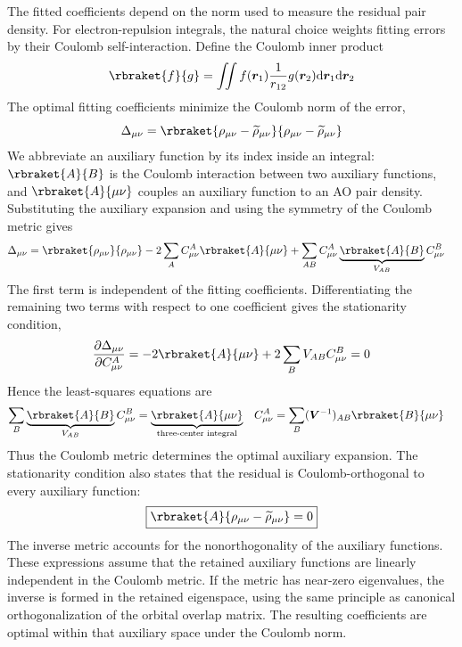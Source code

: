The fitted coefficients depend on the norm used to measure the residual pair
density. For electron-repulsion integrals, the natural choice weights fitting
errors by their Coulomb self-interaction. Define the Coulomb inner product
\begin{equation}
 \rbraket{f}{g}=\iint f(\br_1)\frac{1}{r_{12}}g(\br_2)
 \dd\br_1\dd\br_2
\end{equation}
The optimal fitting coefficients minimize the Coulomb norm of the error,
\begin{equation}
 \Delta_{\mu\nu}=\rbraket{\rho_{\mu\nu}-\widetilde\rho_{\mu\nu}}
 {\rho_{\mu\nu}-\widetilde\rho_{\mu\nu}}
\end{equation}
We abbreviate an auxiliary function by its index inside an integral:
$\rbraket{A}{B}$ is the Coulomb interaction between two auxiliary functions,
and $\rbraket{A}{\mu\nu}$ couples an auxiliary function to an AO pair density.
Substituting the auxiliary expansion and using the symmetry of the Coulomb
metric gives
\begin{equation}
\begin{split}
 \Delta_{\mu\nu}
 ={}&\rbraket{\rho_{\mu\nu}}{\rho_{\mu\nu}}
 -2\sum_A C_{\mu\nu}^A\rbraket{A}{\mu\nu}
 +\sum_{AB}C_{\mu\nu}^A
 \underbrace{\rbraket{A}{B}}_{V_{AB}}C_{\mu\nu}^B
\end{split}
\end{equation}
The first term is independent of the fitting coefficients. Differentiating
the remaining two terms with respect to one coefficient gives the
stationarity condition,
\begin{equation}
 \pdv{\Delta_{\mu\nu}}{C_{\mu\nu}^A}
 =-2\rbraket{A}{\mu\nu}
 +2\sum_BV_{AB}C_{\mu\nu}^B=0
\end{equation}
Hence the least-squares equations are
\begin{align}
  \sum_B\underbrace{\rbraket{A}{B}}_{V_{AB}}C_{\mu\nu}^B
 &=\underbrace{\rbraket{A}{\mu\nu}}_{\text{three-center integral}}
  &
  C_{\mu\nu}^A&=\sum_B(\bV^{-1})_{AB}\rbraket{B}{\mu\nu}
\end{align}
Thus the Coulomb metric determines the optimal auxiliary expansion. The
stationarity condition also states that the residual is Coulomb-orthogonal
to every auxiliary function:
\begin{equation}
  \boxed{
 \rbraket{A}{\rho_{\mu\nu}-\widetilde\rho_{\mu\nu}}=0
  }
 \label{eq:ri-projection-orthogonality}
\end{equation}
The inverse metric accounts for the nonorthogonality of the auxiliary
functions. These expressions assume that the retained auxiliary functions
are linearly independent in the Coulomb metric. If the metric has
near-zero eigenvalues, the inverse is formed in the retained eigenspace,
using the same principle as canonical orthogonalization of the orbital
overlap matrix. The resulting coefficients are optimal within that
auxiliary space under the Coulomb norm.

